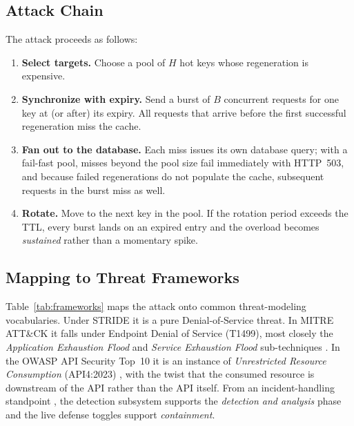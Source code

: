 \subsection{Attack Chain}
The attack proceeds as follows:
\begin{enumerate}[leftmargin=*]
\item \textbf{Select targets.} Choose a pool of $H$ hot keys whose regeneration is
expensive.
\item \textbf{Synchronize with expiry.} Send a burst of $B$ concurrent requests for one
key at (or after) its expiry. All requests that arrive before the first successful
regeneration miss the cache.
\item \textbf{Fan out to the database.} Each miss issues its own database query; with
a fail-fast pool, misses beyond the pool size fail immediately with HTTP~503, and
because failed regenerations do not populate the cache, subsequent requests in the
burst miss as well.
\item \textbf{Rotate.} Move to the next key in the pool. If the rotation period
exceeds the TTL, every burst lands on an expired entry and the overload becomes
\emph{sustained} rather than a momentary spike.
\end{enumerate}

\subsection{Mapping to Threat Frameworks}
Table~\ref{tab:frameworks} maps the attack onto common threat-modeling vocabularies.
Under STRIDE \cite{shostack2014} it is a pure Denial-of-Service threat. In MITRE
ATT\&CK it falls under Endpoint Denial of Service (T1499), most closely the
\emph{Application Exhaustion Flood} and \emph{Service Exhaustion Flood} sub-techniques
\cite{mitret1499}. In the OWASP API Security Top~10 it is an instance of
\emph{Unrestricted Resource Consumption} (API4:2023) \cite{owaspapi2023}, with the
twist that the consumed resource is downstream of the API rather than the API itself.
From an incident-handling standpoint \cite{nist80061}, the detection subsystem
supports the \emph{detection and analysis} phase and the live defense toggles support
\emph{containment}.

